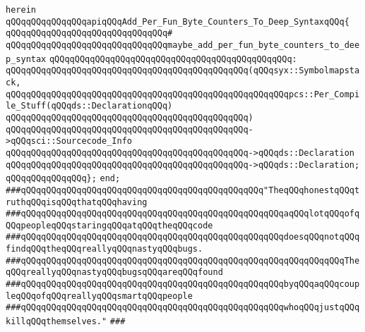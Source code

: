 \verb|herein|\newline
\newline
\verb|qQQqqQQqqQQqqQQqapiqQQqAdd_Per_Fun_Byte_Counters_To_Deep_SyntaxqQQq{|\newline
\verb|qQQqqQQqqQQqqQQqqQQqqQQqqQQqqQQq#|\newline
\verb|qQQqqQQqqQQqqQQqqQQqqQQqqQQqqQQqmaybe_add_per_fun_byte_counters_to_deep_syntax|\newline
\verb|qQQqqQQqqQQqqQQqqQQqqQQqqQQqqQQqqQQqqQQqqQQqqQQq:|\newline
\verb|qQQqqQQqqQQqqQQqqQQqqQQqqQQqqQQqqQQqqQQqqQQqqQQq(qQQqsyx::Symbolmapstack,|\newline
\verb|qQQqqQQqqQQqqQQqqQQqqQQqqQQqqQQqqQQqqQQqqQQqqQQqqQQqqQQqpcs::Per_Compile_Stuff(qQQqds::DeclarationqQQq)|\newline
\verb|qQQqqQQqqQQqqQQqqQQqqQQqqQQqqQQqqQQqqQQqqQQqqQQq)|\newline
\verb|qQQqqQQqqQQqqQQqqQQqqQQqqQQqqQQqqQQqqQQqqQQqqQQq->qQQqsci::Sourcecode_Info|\newline
\verb|qQQqqQQqqQQqqQQqqQQqqQQqqQQqqQQqqQQqqQQqqQQqqQQq->qQQqds::Declaration|\newline
\verb|qQQqqQQqqQQqqQQqqQQqqQQqqQQqqQQqqQQqqQQqqQQqqQQq->qQQqds::Declaration;|\newline
\newline
\verb|qQQqqQQqqQQqqQQq};|\newline
\verb|end;|\newline
\newline
\newline
\verb|###qQQqqQQqqQQqqQQqqQQqqQQqqQQqqQQqqQQqqQQqqQQqqQQq"TheqQQqhonestqQQqtruthqQQqisqQQqthatqQQqhaving|\newline
\verb|###qQQqqQQqqQQqqQQqqQQqqQQqqQQqqQQqqQQqqQQqqQQqqQQqqQQqaqQQqlotqQQqofqQQqpeopleqQQqstaringqQQqatqQQqtheqQQqcode|\newline
\verb|###qQQqqQQqqQQqqQQqqQQqqQQqqQQqqQQqqQQqqQQqqQQqqQQqqQQqdoesqQQqnotqQQqfindqQQqtheqQQqreallyqQQqnastyqQQqbugs.|\newline
\verb|###qQQqqQQqqQQqqQQqqQQqqQQqqQQqqQQqqQQqqQQqqQQqqQQqqQQqqQQqqQQqqQQqTheqQQqreallyqQQqnastyqQQqbugsqQQqareqQQqfound|\newline
\verb|###qQQqqQQqqQQqqQQqqQQqqQQqqQQqqQQqqQQqqQQqqQQqqQQqqQQqbyqQQqaqQQqcoupleqQQqofqQQqreallyqQQqsmartqQQqpeople|\newline
\verb|###qQQqqQQqqQQqqQQqqQQqqQQqqQQqqQQqqQQqqQQqqQQqqQQqqQQqwhoqQQqjustqQQqkillqQQqthemselves."|\newline
\verb|###|\newline
